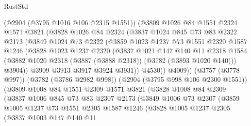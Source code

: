 \begin{lexlean}{RustStd}
\begin{coremodule}
              (@2904 (@3795 @1016 @106 @2315 @1551))
              (@3809
                @1026
                @84
                @1551
                @2324
                @1571
                @3821
                (@3828
                  @1026
                  @84
                  @2324
                  (@3837
                    @1024
                    @845
                    @73
                    @83
                    @2322
                    @2173
                    (@3849
                      @1024
                      @73
                      @2322
                      (@3859
                        @1023
                        @1237
                        @73
                        @1551
                        @2320
                        @1587
                        @1246
                        (@3828
                          @1023
                          @1237
                          @2320
                          (@3837
                            @1021
                            @147
                            @140
                            @11
                            @2318
                            @1584
                            (@3882 @1020 @2318 (@3887 (@3888 @2318)) (@3782 (@3893 @1020 @140)))
                            @3904))
                        @3909
                        @3913
                        @3917
                        @3924
                        @3931))
                    @4530))
                @4009))
            (@3757 (@3778 @997))
            (@3782 (@3786 @2982 @998))
            (@2904 (@3795 @998 @106 @2300 @1551))
            (@3809
              @1008
              @84
              @1551
              @2309
              @1571
              @3821
              (@3828
                @1008
                @84
                @2309
                (@3837
                  @1006
                  @845
                  @73
                  @83
                  @2307
                  @2173
                  (@3849
                    @1006
                    @73
                    @2307
                    (@3859
                      @1005
                      @1237
                      @73
                      @1551
                      @2305
                      @1587
                      @1246
                      (@3828
                        @1005
                        @1237
                        @2305
                        (@3837
                          @1003
                          @147
                          @140
                          @11

\end{coremodule}
\end{lexlean}
